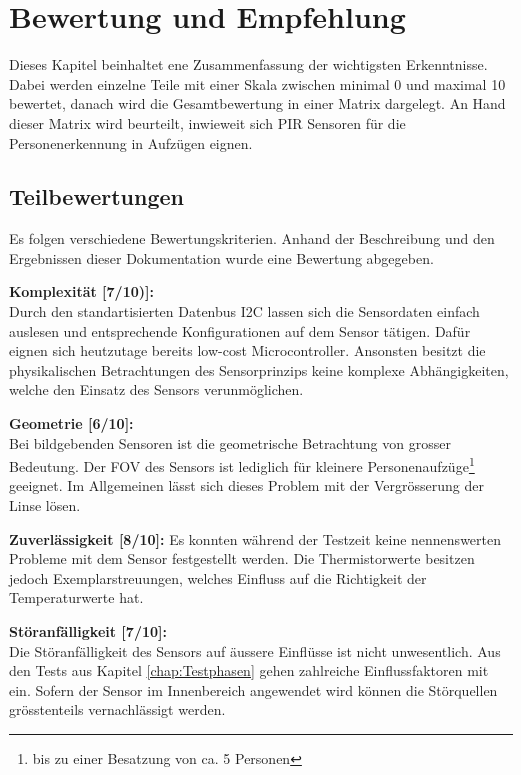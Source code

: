 \chapter{Bewertung und Empfehlung}
\label{Empfehlung_Vorgehen}

Dieses Kapitel beinhaltet ene Zusammenfassung der wichtigsten Erkenntnisse. Dabei werden einzelne Teile mit einer Skala zwischen minimal 0  und maximal 10  bewertet, danach wird die Gesamtbewertung in einer Matrix dargelegt. An Hand dieser Matrix wird beurteilt, inwieweit sich PIR Sensoren für die Personenerkennung in Aufzügen eignen. 

\section{Teilbewertungen}
\label{sec:Teilbewertung}

Es folgen verschiedene Bewertungskriterien. Anhand der Beschreibung und den Ergebnissen dieser Dokumentation wurde eine Bewertung abgegeben.

\textbf{Komplexität [7/10)]:} \\
Durch den standartisierten Datenbus \ac{I2C} lassen sich die Sensordaten einfach auslesen und entsprechende Konfigurationen auf dem Sensor tätigen. Dafür eignen sich heutzutage bereits low-cost Microcontroller. Ansonsten besitzt die physikalischen Betrachtungen des Sensorprinzips keine komplexe Abhängigkeiten, welche den Einsatz des Sensors verunmöglichen.

\textbf{Geometrie [6/10]:} \\
Bei bildgebenden Sensoren ist die geometrische Betrachtung von grosser Bedeutung. Der \ac{FOV} des Sensors ist lediglich für kleinere Personenaufzüge\footnote{bis zu einer Besatzung von ca. 5 Personen} geeignet. Im Allgemeinen lässt sich dieses Problem mit der Vergrösserung der Linse lösen.

\textbf{Zuverlässigkeit [8/10]:}
Es konnten während der Testzeit keine nennenswerten Probleme mit dem Sensor festgestellt werden. Die Thermistorwerte besitzen jedoch Exemplarstreuungen, welches Einfluss auf die Richtigkeit der Temperaturwerte hat.
  
\textbf{Störanfälligkeit [7/10]:} \\
Die Störanfälligkeit des Sensors auf äussere Einflüsse ist nicht unwesentlich. Aus den Tests aus Kapitel \ref{chap:Testphasen} gehen zahlreiche Einflussfaktoren mit ein. Sofern der Sensor im Innenbereich angewendet wird können die Störquellen grösstenteils vernachlässigt werden.

